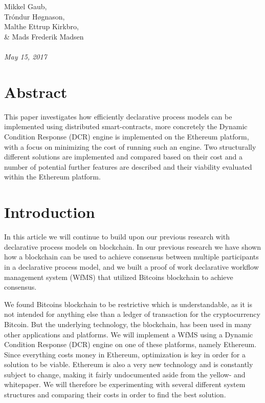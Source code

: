 \documentclass{article}
\begin{document}
\normalem
	\begin{titlepage}
		 \\ \\
		Mikkel Gaub, \\ Tróndur Høgnason, \\ Malthe Ettrup Kirkbro, \\ \& Mads Frederik Madsen	\\ \\
		\hspace{-18pt}
		\textit{May 15, 2017}
		\vspace{\fill}
		\section*{Abstract}
		This paper investigates how efficiently declarative process models can be implemented using distributed smart-contracts, more concretely the Dynamic Condition Response (DCR) engine is implemented on the Ethereum platform, with a focus on minimizing the cost of running such an engine. 
		Two structurally different solutions are implemented and compared based on their cost and a number of potential further features are described and their viability evaluated within the Ethereum platform.
		\thispagestyle{empty}
	\end{titlepage}
	\clearpage

	\setcounter{page}{1}

	\setcounter{tocdepth}{2}
	\tableofcontents
	\pagebreak

	\section{Introduction}
	In this article we will continue to build upon our previous research with declarative process models on blockchain. 
	In our previous research we have shown how a blockchain can be used to achieve consensus between multiple participants in a declarative process model, and we built a proof of work declarative workflow management system (WfMS) that utilized Bitcoins blockchain to achieve consensus.
 
	We found Bitcoins blockchain to be restrictive which is understandable, as it is not intended for anything else than a ledger of transaction for the cryptocurrency Bitcoin. 
	But the underlying technology, the blockchain, has been used in many other applications and platforms. 
	We will implement a WfMS using a Dynamic Condition Response (DCR) engine on one of these platforms, namely Ethereum.
	Since everything costs money in Ethereum, optimization is key in order for a solution to be viable.
	Ethereum is also a very new technology and is constantly subject to change, making it fairly undocumented aside from the yellow- and whitepaper.
	We will therefore be experimenting with several different system structures and comparing their costs in order to find the best solution.
\end{document}
